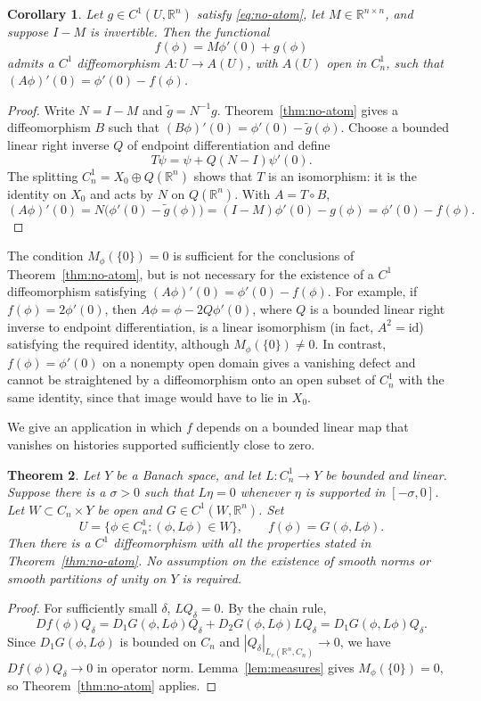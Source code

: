 \documentclass[11pt]{article}
\newtheorem{theorem}{Theorem}[section]
\newtheorem{corollary}[theorem]{Corollary}
\newcommand{\Lc}{L_c}
\newcommand{\id}{\mathrm{id}}
\begin{document}
\begin{corollary}\label{cor:coupling}
Let $g\in C^1(U,\mathbb R^n)$ satisfy \eqref{eq:no-atom}, let $M\in\mathbb R^{n\times n}$, and suppose $I-M$ is invertible. Then the functional
\[
 f(\phi)=M\phi'(0)+g(\phi)
\]
admits a $C^1$ diffeomorphism
$A:U\to A(U)$, with $A(U)$ open in $C_n^1$,
such that
$(A\phi)'(0)=\phi'(0)-f(\phi)$.
\end{corollary}
\begin{proof}
Write $N=I-M$ and $\widetilde g=N^{-1}g$. Theorem~\ref{thm:no-atom} gives a diffeomorphism $B$ such that $(B\phi)'(0)=\phi'(0)-\widetilde g(\phi)$. Choose a bounded linear right inverse $Q$ of endpoint differentiation and define
\[
 T\psi=\psi+Q(N-I)\psi'(0).
\]
The splitting $C_n^1=X_0\oplus Q(\mathbb R^n)$ shows that $T$ is an isomorphism: it is the identity on $X_0$ and acts by $N$ on $Q(\mathbb R^n)$. With $A=T\circ B$,
\[
 (A\phi)'(0)=N\bigl(\phi'(0)-\widetilde g(\phi)\bigr)
  =(I-M)\phi'(0)-g(\phi)=\phi'(0)-f(\phi).
\]
\end{proof}

The condition $M_\phi(\{0\})=0$ is sufficient for
the conclusions of Theorem~\ref{thm:no-atom},
but is not necessary for the existence of a
$C^1$ diffeomorphism satisfying
$(A\phi)'(0)=\phi'(0)-f(\phi)$.
For example, if $f(\phi)=2\phi'(0)$, then
$A\phi=\phi-2Q\phi'(0)$, where $Q$ is a bounded
linear right inverse to endpoint differentiation,
is a linear isomorphism (in fact, $A^2=\id$)
satisfying the required identity, although
$M_\phi(\{0\})\ne0$.
In contrast, $f(\phi)=\phi'(0)$ on a nonempty
open domain gives a vanishing defect and cannot
be straightened by a diffeomorphism onto an open
subset of $C_n^1$ with the same identity, since
that image would have to lie in $X_0$.

We give an application in which $f$ depends on a bounded linear map
that vanishes on histories supported sufficiently close to zero.

\begin{theorem}\label{thm:remote}
Let $Y$ be a Banach space, and let $L:C_n^1\to Y$ be bounded and linear. Suppose there is a $\sigma>0$ such that $L\eta=0$ whenever $\eta$ is supported in $[-\sigma,0]$. Let $W\subset C_n\times Y$ be open and $G\in C^1(W,\mathbb R^n)$. Set
\[
 U=\{\phi\in C_n^1:(\phi,L\phi)\in W\},\qquad
 f(\phi)=G(\phi,L\phi).
\]
Then there is a $C^1$ diffeomorphism with all the properties stated
in Theorem~\ref{thm:no-atom}. No assumption on the existence of
smooth norms or smooth partitions of unity on $Y$ is required.
\end{theorem}
\begin{proof}
For sufficiently small $\delta$, $LQ_\delta=0$. By the chain rule,
\[
 Df(\phi)Q_\delta
 =D_1G(\phi,L\phi)Q_\delta
   +D_2G(\phi,L\phi)LQ_\delta
 =D_1G(\phi,L\phi)Q_\delta.
\]
Since $D_1G(\phi,L\phi)$ is bounded on $C_n$ and
$|Q_\delta|_{\Lc(\mathbb R^n,C_n)}\to0$, we have
$Df(\phi)Q_\delta\to0$ in operator norm. Lemma~\ref{lem:measures}
gives $M_\phi(\{0\})=0$, so Theorem~\ref{thm:no-atom} applies.
\end{proof}
\end{document}
